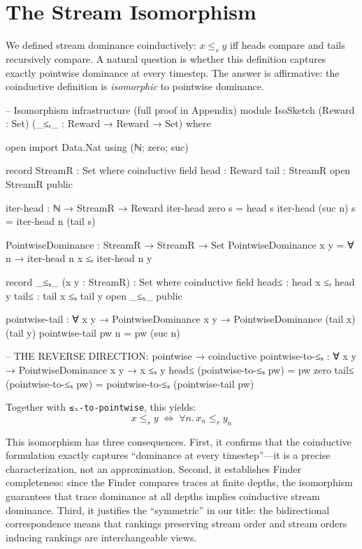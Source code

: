 \documentclass[9pt,a4paper]{article}
\theoremstyle{plain}
\theoremstyle{definition}
\theoremstyle{remark}
\begin{document}
\section{The Stream Isomorphism}
\label{sec:stream-iso}

We defined stream dominance coinductively: $x \le_s y$ iff heads compare and tails recursively compare.  A natural question is whether this definition captures exactly pointwise dominance at every timestep.  The answer is affirmative: the coinductive definition is \emph{isomorphic} to pointwise dominance.

\begin{code}[hide]
-- Isomorphism infrastructure (full proof in Appendix)
module IsoSketch
  (Reward : Set)
  (_≤ᵣ_ : Reward → Reward → Set)
  where
  
  open import Data.Nat using (ℕ; zero; suc)
  
  record StreamR : Set where
    coinductive
    field head : Reward
          tail : StreamR
  open StreamR public
  
  iter-head : ℕ → StreamR → Reward
  iter-head zero s = head s
  iter-head (suc n) s = iter-head n (tail s)
  
  PointwiseDominance : StreamR → StreamR → Set
  PointwiseDominance x y = ∀ n → iter-head n x ≤ᵣ iter-head n y

  record _≤ₛ_ (x y : StreamR) : Set where
    coinductive
    field head≤ : head x ≤ᵣ head y
          tail≤ : tail x ≤ₛ tail y
  open _≤ₛ_ public
  
  pointwise-tail : ∀ {x y} → PointwiseDominance x y → PointwiseDominance (tail x) (tail y)
  pointwise-tail pw n = pw (suc n)
\end{code}

\begin{code}
  -- THE REVERSE DIRECTION: pointwise → coinductive
  pointwise-to-≤ₛ : ∀ {x y} → PointwiseDominance x y → x ≤ₛ y
  head≤ (pointwise-to-≤ₛ pw) = pw zero
  tail≤ (pointwise-to-≤ₛ pw) = pointwise-to-≤ₛ (pointwise-tail pw)
\end{code}

\noindent Together with \texttt{≤ₛ-to-pointwise}, this yields:
\[
x \le_s y \;\Longleftrightarrow\; \forall n.\, x_n \le_r y_n
\]

This isomorphism has three consequences.  First, it confirms that the coinductive formulation exactly captures ``dominance at every timestep''---it is a precise characterization, not an approximation.  Second, it establishes Finder completeness: since the Finder compares traces at finite depths, the isomorphism guarantees that trace dominance at all depths implies coinductive stream dominance.  Third, it justifies the ``symmetric'' in our title: the bidirectional correspondence means that rankings preserving stream order and stream orders inducing rankings are interchangeable views.
\end{document}

